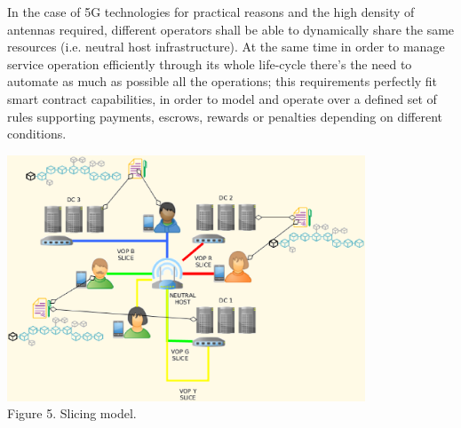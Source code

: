 \documentclass[12pt]{amsart}
\begin{document}
\begin{multicols}{2}
\vspace{0.35cm}

In the case of 5G technologies for practical reasons
and the high density of antennas required,
different operators shall be able
to dynamically share the same resources (i.e. neutral host
infrastructure). At the same time in order to manage
service operation efficiently through its whole
life-cycle there's the need to automate as much as
possible all the operations; this requirements
perfectly fit smart contract capabilities, in order
to model and operate over a defined set of rules
supporting payments, escrows, rewards or penalties
depending on different conditions.

\end{multicols}
\begin{center}
  \includegraphics[keepaspectratio, width=0.8\textwidth]{images/bc5g/slices-y.eps}
\\
Figure 5. Slicing model.
\\
\end{center}
\end{document}
